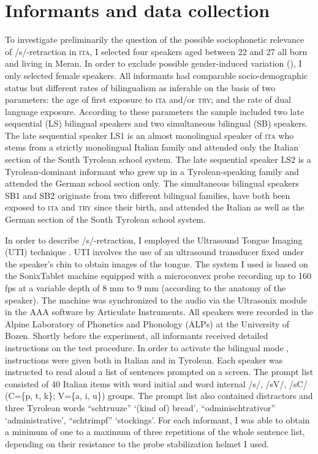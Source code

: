 \documentclass[output=paper]{LSP/langsci}
\begin{document}
\section{Informants and data collection}
To investigate preliminarily the question of the possible sociophonetic relevance of /s/-retraction in \textsc{ita}, I selected four speakers aged between 22 and 27 all born and living in Meran. In order to exclude possible gender-induced variation (\cite{fuchs_differences_2011}), I only selected female speakers. All informants had comparable socio-demographic status but different rates of bilingualism as inferable on the basis of two parameters: the age of first exposure to \textsc{ita} and/or \textsc{try}; and the rate of dual language exposure. According to these parameters the sample included two late sequential (LS) bilingual speakers and two simultaneous bilingual (SB) speakers. The late sequential speaker LS1 is an almost monolingual speaker of \textsc{ita} who stems from a strictly monolingual Italian family and attended only the Italian section of the South Tyrolean school system. The late sequential speaker LS2 is a Tyrolean-dominant informant who grew up in a Tyrolean-speaking family and attended the German school section only. The simultaneous bilingual speakers SB1 and SB2 originate from two different bilingual families, have both been exposed to \textsc{ita} and \textsc{try} since their birth, and attended the Italian as well as the German section of the South Tyrolean school system.

In order to describe /s/-retraction, I employed the Ultrasound Tongue Imaging (UTI) technique \citep{stone_guide_2005}. UTI involves the use of an ultrasound transducer fixed under the speaker’s chin to obtain images of the tongue. The system I used is based on the SonixTablet machine equipped with a microconvex probe recording up to 160 fps at a variable depth of 8 mm to 9 mm (according to the anatomy of the speaker). The machine was synchronized to the audio via the Ultrasonix module in the AAA software by Articulate Instruments. All speakers were recorded in the Alpine Laboratory of Phonetics and Phonology (ALPs) at the University of Bozen. Shortly before the experiment, all informants received detailed instructions on the test procedure. In order to activate the bilingual mode \citep{grosjean_transfer_1998}, instructions were given both in Italian and in Tyrolean. Each speaker was instructed to read aloud a list of sentences prompted on a screen. The prompt list consisted of 40 Italian items with word initial and word internal /s/, /sV/, /sC/ (C=\{p, t, k\}; V=\{a, i, u\}) groups. The prompt list also contained distractors and three Tyrolean words “schtruuze” `(kind of) bread', “odminischtrativor” `administrative', “schtrimpf” `stockings'. For each informant, I was able to obtain a minimum of one to a maximum of three repetitions of the whole sentence list, depending on their resistance to the probe stabilization helmet I used.
\end{document}
